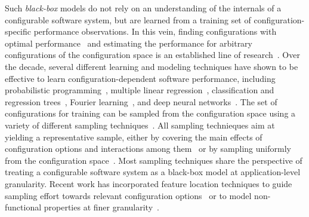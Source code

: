 Such \emph{black-box} models do not rely on an understanding of the internals of a configurable software system, but are learned from a training set of configuration-specific performance observations. In this vein, finding configurations with optimal performance~\cite{chen_mmo_2021,nairUsingBadLearners2017,nairFlash18,ohFindingNearoptimalConfigurations2017} and estimating the performance for arbitrary configurations of the configuration space is an established line of research~\cite{dorn2020,siegmundPerformanceinfluenceModelsHighly2015,haDeepPerf2019,perfAL,guoVariabilityawarePerformancePrediction2013,sarkarCostEfficientSamplingPerformance,guo_2018_data,fourier_learning_2015,perLasso,chen_hinnperf_2022}.
Over the decade, several different learning and modeling techniques have shown to be effective to learn configuration-dependent software performance,  including probabilistic programming~\cite{dorn2020}, multiple linear regression~\cite{siegmundPerformanceinfluenceModelsHighly2015}, classification and regression trees~\cite{guoVariabilityawarePerformancePrediction2013,sarkarCostEfficientSamplingPerformance,guo_2018_data}, Fourier learning~\cite{fourier_learning_2015,perLasso}, and deep neural networks~\cite{haDeepPerf2019,perfAL,chen_hinnperf_2022}.
The set of configurations for training can be sampled from the configuration space using a variety of different sampling techniques~\cite{kaltenecker_interplay_2020,medeiros_comparison_2016}. All sampling technieques aim at yielding a representative sample, either by covering the main effects of configuration options and interactions among them~\cite{siegmundPredictingPerformanceAutomated2012} or by sampling uniformly from the configuration space~\cite{ohFindingNearoptimalConfigurations2017,kaltenecker_distance-based_2019}.
Most sampling techniques share the perspective of treating a configurable software system as a black-box model at application-level granularity. Recent work has incorporated feature location techniques to guide sampling effort towards relevant configuration options~\cite{velez_2020_configcrusher_jase,velez_comprex_2021} or to model non-functional properties at finer granularity~\cite{weber_white_2021,han_confprof_2021}.

